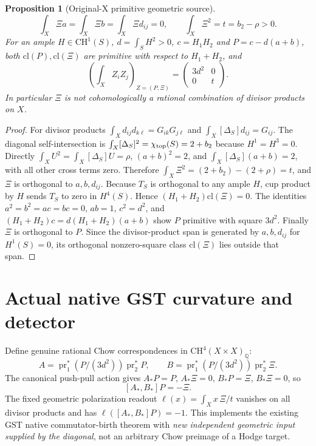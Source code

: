 \documentclass[11pt]{article}
\newtheorem{proposition}{Proposition}
\newcommand{\Q}{\mathbb Q}
\newcommand{\CH}{\mathrm{CH}}
\newcommand{\cl}{\mathrm{cl}}
\begin{document}
\begin{proposition}[Original-X primitive geometric source]
\[
 \int_X\Xi a=\int_X\Xi b=\int_X\Xi d_{ij}=0,
 \qquad\boxed{\int_X\Xi^2=t=b_2-\rho>0.}
\]
For an ample $H\in\CH^1(S)$, $d=\int_SH^2>0$, $c=H_1H_2$ and $P=c-d(a+b)$, both $\cl(P),\cl(\Xi)$ are primitive with respect to $H_1+H_2$, and
\[
\boxed{\left(\int_X Z_iZ_j\right)_{Z=(P,\Xi)}
=\begin{pmatrix}3d^2&0\\0&t\end{pmatrix}.}
\]
In particular $\Xi$ is not cohomologically a rational combination of divisor products on $X$.
\end{proposition}
\begin{proof}
For divisor products $\int_Xd_{ij}d_{k\ell}=G_{ik}G_{j\ell}$ and $\int_X[\Delta_S]d_{ij}=G_{ij}$.
The diagonal self-intersection is $\int_X[\Delta_S]^2=\chi_{\rm top}(S)=2+b_2$ because $H^1=H^3=0$.
Directly $\int_XU^2=\int_X[\Delta_S]U=\rho$, $(a+b)^2=2$, and $\int_X[\Delta_S](a+b)=2$, with all other cross terms zero. Therefore
$\int_X\Xi^2=(2+b_2)-(2+\rho)=t$, and $\Xi$ is orthogonal to $a,b,d_{ij}$.
Because $T_S$ is orthogonal to any ample $H$, cup product by $H$ sends $T_S$ to zero in $H^4(S)$. Hence $(H_1+H_2)\cl(\Xi)=0$.
The identities $a^2=b^2=ac=bc=0$, $ab=1$, $c^2=d^2$, and $(H_1+H_2)c=d(H_1+H_2)(a+b)$ show $P$ primitive with square $3d^2$. Finally $\Xi$ is orthogonal to $P$. Since the divisor-product span is generated by $a,b,d_{ij}$ for $H^1(S)=0$, its orthogonal nonzero-square class $\cl(\Xi)$ lies outside that span.
\end{proof}

\section{Actual native GST curvature and detector}
Define genuine rational Chow correspondences in $\CH^4(X\times X)_\Q$:
\[
 A=\operatorname{pr}_1^*(P/(3d^2))\operatorname{pr}_2^*P,\qquad
 B=\operatorname{pr}_1^*(P/(3d^2))\operatorname{pr}_2^*\Xi.
\]
The canonical push-pull action gives $A_*P=P$, $A_*\Xi=0$, $B_*P=\Xi$, $B_*\Xi=0$, so
\[
 \boxed{[A_*,B_*]P=-\Xi.}
\]
The fixed geometric polarization readout $\ell(x)=\int_Xx\,\Xi/t$ vanishes on all divisor products and has $\ell([A_*,B_*]P)=-1$. This implements the existing GST native commutator-birth theorem with \emph{new independent geometric input supplied by the diagonal}, not an arbitrary Chow preimage of a Hodge target.
\end{document}
